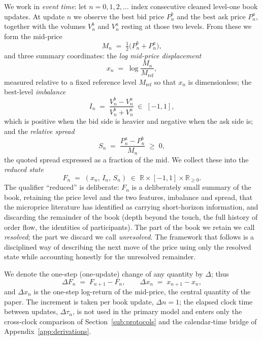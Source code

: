 \documentclass[11pt]{article}
\theoremstyle{plain}
\theoremstyle{definition}
\newcommand{\Real}{\mathbb{R}}
\begin{document}
We work in \emph{event time}: let $n=0,1,2,\dots$ index consecutive cleaned
level-one book updates. At update $n$ we observe the best bid price $P^b_n$ and the best
ask price $P^a_n$, together with the volumes $V^b_n$ and $V^a_n$ resting at those
two levels. From these we form the mid-price
\begin{equation}
  M_n \;=\; \tfrac{1}{2}\bigl(P^b_n + P^a_n\bigr),
\end{equation}
and three summary coordinates: the \emph{log mid-price displacement}
\begin{equation}
  x_n \;=\; \log\!\frac{M_n}{M_{\mathrm{ref}}},
  \label{eq:x}
\end{equation}
measured relative to a fixed reference level $M_{\mathrm{ref}}$ so that $x_n$ is
dimensionless; the best-level \emph{imbalance}
\begin{equation}
  I_n \;=\; \frac{V^b_n - V^a_n}{V^b_n + V^a_n} \;\in\; [-1,1],
  \label{eq:I}
\end{equation}
which is positive when the bid side is heavier and negative when the ask side is;
and the \emph{relative spread}
\begin{equation}
  S_n \;=\; \frac{P^a_n - P^b_n}{M_n} \;\ge\; 0,
  \label{eq:S}
\end{equation}
the quoted spread expressed as a fraction of the mid. We collect these into the
\emph{reduced state}
\begin{equation}
  F_n \;=\; (x_n,\, I_n,\, S_n) \;\in\; \Real\times[-1,1]\times\Real_{\ge 0}.
  \label{eq:state}
\end{equation}
The qualifier ``reduced'' is deliberate: $F_n$ is a deliberately small summary of
the book, retaining the price level and the two features, imbalance and
spread, that the microprice literature has identified as carrying short-horizon
information, and discarding the remainder of the book (depth beyond the touch, the
full history of order flow, the identities of participants). The part of the book
we retain we call \emph{resolved}; the part we discard we call \emph{unresolved}.
The framework that follows is a disciplined way of describing the next move of the
price using only the resolved state while accounting honestly for the unresolved
remainder.

We denote the one-step (one-update) change of any quantity by $\Delta$; thus
\begin{equation}
  \Delta F_n \;=\; F_{n+1} - F_n,
  \qquad
  \Delta x_n \;=\; x_{n+1} - x_n,
\end{equation}
and $\Delta x_n$ is the one-step log-return of the mid-price, the central quantity
of the paper. The increment is taken per book update, $\Delta n = 1$; the elapsed
clock time between updates, $\Delta\tau_n$, is not used in the primary model and
enters only the cross-clock comparison of Section~\ref{sub:protocols} and
the calendar-time bridge of Appendix~\ref{app:derivations}.
\end{document}
